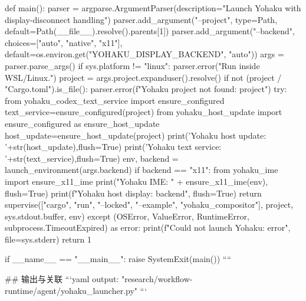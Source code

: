 def main():
    parser = argparse.ArgumentParser(description="Launch Yohaku with display-disconnect handling")
    parser.add_argument("--project", type=Path, default=Path(__file__).resolve().parents[1])
    parser.add_argument("--backend", choices=["auto", "native", "x11"], default=os.environ.get("YOHAKU_DISPLAY_BACKEND", "auto"))
    args = parser.parse_args()
    if sys.platform != "linux": parser.error("Run inside WSL/Linux.")
    project = args.project.expanduser().resolve()
    if not (project / "Cargo.toml").is_file(): parser.error(f"Yohaku project not found: {project}")
    try:
        from yohaku_codex_text_service import ensure_configured
        text_service=ensure_configured(project)
        from yohaku_host_update import ensure_configured as ensure_host_update
        host_update=ensure_host_update(project)
        print('Yohaku host update: '+str(host_update),flush=True)
        print('Yohaku text service: '+str(text_service),flush=True)
        env, backend = launch_environment(args.backend)
        if backend == "x11":
            from yohaku_ime import ensure_x11_ime
            print("Yohaku IME: " + ensure_x11_ime(env), flush=True)
        print(f"Yohaku host display: {backend}", flush=True)
        return supervise(["cargo", "run", "--locked", "--example", "yohaku_compositor"], project, sys.stdout.buffer, env)
    except (OSError, ValueError, RuntimeError, subprocess.TimeoutExpired) as error:
        print(f"Could not launch Yohaku: {error}", file=sys.stderr)
        return 1


if __name__ == "__main__":
    raise SystemExit(main())
````

## 输出与关联
```yaml
output: "research/workflow-runtime/agent/yohaku_launcher.py"
```
